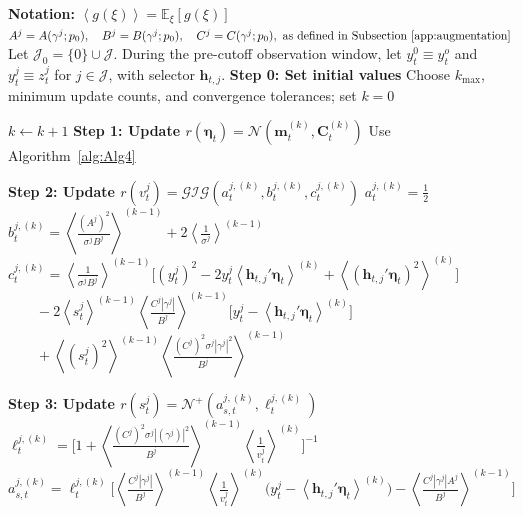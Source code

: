 \begin{algorithm}
\caption{Historical-window variational Bayes (VB) coordinate updates}
\label{alg:Alg3}
\begin{algorithmic}

\State \textbf{Notation:}
\State  $\left\langle g(\xi) \right\rangle = \mathbb{E}_\xi\left[ g(\xi) \right]$
\State  \(
A^j = A(\gamma^j;p_0), \quad B^j = B(\gamma^j;p_0), \quad C^j = C(\gamma^j;p_0), \text{ as defined in Subsection~\ref{app:augmentation}}
\)
\State  Let \(\mathcal{J}_0=\{0\}\cup\mathcal{J}\). During the pre-cutoff observation window, let \(y_t^0 \equiv y_t^o\) and \(y_t^j \equiv z_t^j\) for \(j\in\mathcal{J}\), with selector \(\mathbf{h}_{t,j}\).
\State \textbf{Step 0: Set initial values}
\State Choose \(k_{\max}\), minimum update counts, and convergence tolerances; set \(k=0\)

    \State \(k \leftarrow k+1\)
    \State \textbf{Step 1: Update $r(\boldsymbol{\eta}_t)=\mathcal{N}(\mathbf m^{(k)}_t,\mathbf C^{(k)}_t)$}
    \State Use Algorithm~\ref{alg:Alg4}

        \State \textbf{Step 2: Update $r(v^j_t)=\mathcal{GIG}(a_t^{j,(k)},b_t^{j,(k)},c_t^{j,(k)})$}
            \State $a_t^{j,(k)} = \frac{1}{2}$
            \State $b_t^{j,(k)} = \left\langle \frac{(A^j)^2}{\sigma^j B^j} \right\rangle^{(k-1)} + 2 \left\langle \frac{1}{\sigma^j} \right\rangle^{(k-1)}$
            \State $c_t^{j,(k)} = \left\langle \frac{1}{\sigma^j B^j} \right\rangle^{(k-1)} \Big[ (y_t^j)^2 - 2y_t^j \left\langle  \mathbf{h}_{t,j}' \boldsymbol{\eta}_t \right\rangle^{(k)} + \left\langle (  \mathbf{h}_{t,j}' \boldsymbol{\eta}_t )^2 \right\rangle^{(k)} \Big]$
            \State $\quad \quad -2 \left\langle s^j_t \right\rangle^{(k-1)} \left\langle \frac{C^j|\gamma^j|}{B^j} \right\rangle^{(k-1)} \Big[ y_t^j - \left\langle  \mathbf{h}_{t,j}' \boldsymbol{\eta}_t \right\rangle^{(k)} \Big]$
            \State $\quad \quad + \left\langle (s^j_t)^2 \right\rangle^{(k-1)} \left\langle \frac{(C^j)^2\sigma^j|\gamma^j|^2}{B^j} \right\rangle^{(k-1)}$
        \EndFor

        \State \textbf{Step 3: Update $r(s^j_t)=\mathcal{N}^+(a_{s,t}^{j,(k)},\ell_t^{j,(k)})$}
            \State $\ell_t^{j,(k)} = \Big[ 1+\left\langle \frac{(C^j)^2 \sigma^j |(\gamma^j)|^2}{B^j} \right\rangle^{(k-1)} \left\langle \frac{1}{v^j_t} \right\rangle^{(k)} \Big]^{-1}$
            \State $a_{s,t}^{j,(k)} = \ell_t^{j,(k)}  \Big[ \left\langle \frac{C^j |\gamma^j|}{B^j} \right\rangle^{(k-1)} \left\langle \frac{1}{v^j_t} \right\rangle^{(k)} \Big( y_t^j - \left\langle  \mathbf{h}_{t,j}' \boldsymbol{\eta}_t \right\rangle^{(k)} \Big) - \left\langle \frac{C^j |\gamma^j| A^j}{B^j} \right\rangle^{(k-1)} \Big]$
        \EndFor


\end{algorithmic}
\end{algorithm}
